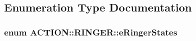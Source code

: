 \subsection{\-Enumeration \-Type \-Documentation}
\hypertarget{namespace_a_c_t_i_o_n_1_1_r_i_n_g_e_r_ab667be2b08eb6ff2fb0a50199ea7546e}{
\subsubsection[{e\-Ringer\-States}]{\setlength{\rightskip}{0pt plus 5cm}enum {\bf \-A\-C\-T\-I\-O\-N\-::\-R\-I\-N\-G\-E\-R\-::e\-Ringer\-States}}}
\label{namespace_a_c_t_i_o_n_1_1_r_i_n_g_e_r_ab667be2b08eb6ff2fb0a50199ea7546e}
